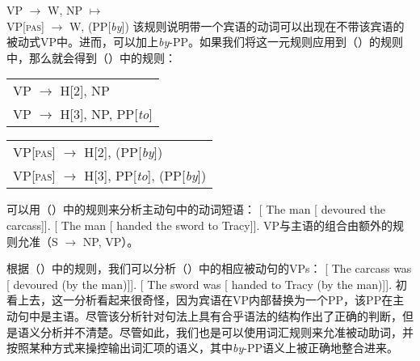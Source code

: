 \ea
VP  $\to$ W, NP $\mapsto$\\
VP[\textsc{pas}]  $\to$ W, (PP[\emph{by}])
\z
该规则说明带一个宾语的动词可以出现在不带该宾语的被动式VP中。进而，可以加上\emph{by}-PP。如果我们将这一元规则应用到（）的规则中，那么就会得到（）中的规则：
\ea
\begin{tabular}[t]{@{}l@{}}
VP $\to$ H[2], NP\\
VP $\to$ H[3], NP, PP[\emph{to}]\\
\end{tabular}
\z
\ea
\begin{tabular}[t]{@{}l@{}}
VP[\textsc{pas}] $\to$ H[2], (PP[\emph{by}])\\
VP[\textsc{pas}] $\to$ H[3], PP[\emph{to}], (PP[\emph{by}])\\
\end{tabular}
\z
可以用（）中的规则来分析主动句中的动词短语：
\eal
\ex{} [ The man [ devoured the carcass]].
\ex{} [ The man [ handed the sword to Tracy]].
\zl
VP与主语的组合由额外的规则允准（S $\to$ NP, VP）。

根据（）中的规则，我们可以分析（）中的相应被动句的VPs：
\eal
\ex{} [ The carcass was [ devoured (by the man)]].
\ex{} [ The sword was [ handed to Tracy (by the man)]].
\zl
%
初看上去，这一分析看起来很奇怪，因为宾语在VP内部替换为一个PP，该PP在主动句中是主语。尽管该分析针对句法上具有合乎语法的结构作出了正确的判断，但是语义分析并不清楚。尽管如此，我们也是可以使用词汇规则来允准被动助词，并按照某种方式来操控输出词汇项的语义，其中\emph{by}-PP语义上被正确地整合进来\citep[]{GKPS85a}。

